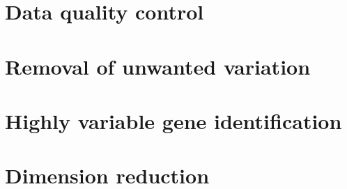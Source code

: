 \section{Data quality control}


\clearpage

\section{Removal of unwanted variation}




\clearpage

\section{Highly variable gene identification}



\clearpage

\section{Dimension reduction}



\clearpage